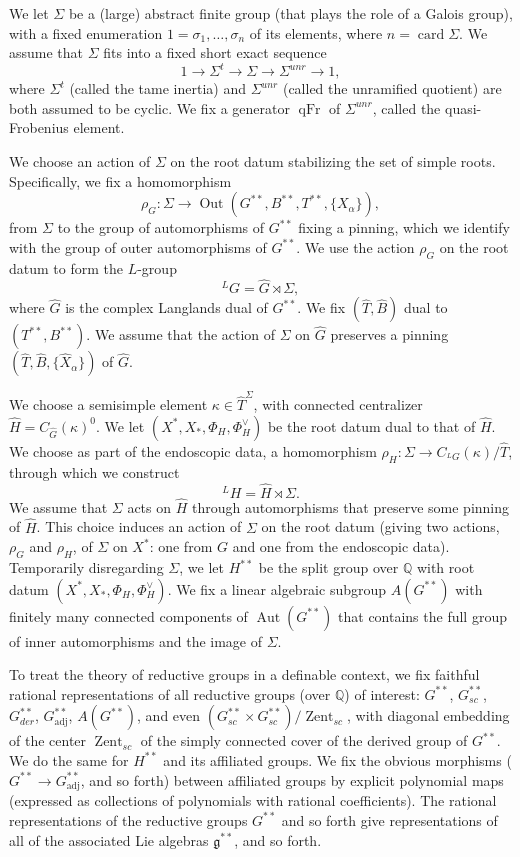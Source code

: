 \documentclass[12pt]{amsart}
\newcommand{\op}[1]{\operatorname{#1}}
\newcommand{\ring}[1]{{\mathbb #1}}
\newcommand{\fg}{\mathfrak{g}}
\theoremstyle{plain}
\theoremstyle{definition}
\begin{document}
We let $\Sigma$ be a (large) abstract finite group (that plays the
role of a Galois group), with a fixed enumeration
$1=\sigma_1,\ldots,\sigma_n$ of its elements, where $n =
\op{card}{\Sigma}$.
We assume that $\Sigma$ fits into a fixed short exact sequence
\[
1 \to \Sigma^t \to \Sigma \to \Sigma^{unr} \to 1,
\]
where $\Sigma^t$ (called the tame inertia) and $\Sigma^{unr}$ (called
the unramified quotient) are both assumed to be cyclic.  We fix a
generator $\op{qFr}$ of $\Sigma^{unr}$, called the quasi-Frobenius
element.


We choose an action of $\Sigma$ on the root datum stabilizing the set
of simple roots.  Specifically, we fix a homomorphism
\[
\rho_G:\Sigma\to \op{Out}(G^{**},B^{**},T^{**},\{X_\alpha\}),
\]
from $\Sigma$ to the group of automorphisms of $G^{**}$ fixing a
pinning, which we identify with the group of outer automorphisms of
$G^{**}$.  We use the action $\rho_G$ on the root datum to form the
$L$-group
\[
{}^LG = \hat G \rtimes \Sigma,
\]
where $\hat G$ is the complex Langlands dual of $G^{**}$.
We fix $(\hat T,\hat B)$ dual to $(T^{**},B^{**})$.    We assume
that the action of $\Sigma$ on $\hat G$ preserves a pinning
$(\hat T,\hat B,\{\hat X_\alpha\})$ of $\hat G$.  

We choose a semisimple element $\kappa\in \hat T^\Sigma$, with
connected centralizer $\hat H = C_{\hat G}(\kappa)^0$.  We let
$(X^*,X_*,\Phi_H,\Phi_H^\vee)$ be the root datum dual to that
of $\hat H$.  We choose as part of the endoscopic data,
a homomorphism $\rho_H:\Sigma \to C_{{}^LG}(\kappa)/\hat T$,
through which we construct
\[
{}^LH = \hat H \rtimes \Sigma.
\]
We assume that $\Sigma$ acts on $\hat H$ through automorphisms that
preserve some pinning of $\hat H$.  This choice induces an action of
$\Sigma$ on the root datum (giving two actions, $\rho_G$ and $\rho_H$,
of $\Sigma$ on $X^*$: one from $G$ and one from the endoscopic data).
Temporarily disregarding $\Sigma$, we let $H^{**}$ be the split group
over $\ring{Q}$ with root datum $(X^*,X_*,\Phi_H,\Phi_H^\vee)$.  We
fix a linear algebraic subgroup $A(G^{**})$ with finitely many
connected components of $\op{Aut}(G^{**})$ that contains the full
group of inner automorphisms and the image of $\Sigma$.

To treat the theory of reductive groups in a definable context, we fix
faithful rational representations of all reductive groups (over
$\ring{Q}$) of interest: $G^{**}$, $G^{**}_{sc}$, $G^{**}_{der}$,
$G^{**}_{\op{adj}}$, $A(G^{**})$, and even $(G^{**}_{sc}\times
G^{**}_{sc})/\op{Zent}_{sc}$, with diagonal embedding of the center
$\op{Zent}_{sc}$ of the simply connected cover of the derived group of
$G^{**}$.  We do the same for $H^{**}$ and its affiliated groups.  We
fix the obvious morphisms ($G^{**}\to G^{**}_{\op{adj}}$, and so forth)
between affiliated groups by explicit polynomial maps (expressed as
collections of polynomials with rational coefficients).  The rational
representations of the reductive groups $G^{**}$ and so forth give
representations of all of the associated Lie algebras $\fg^{**}$, and
so forth.
\end{document}
